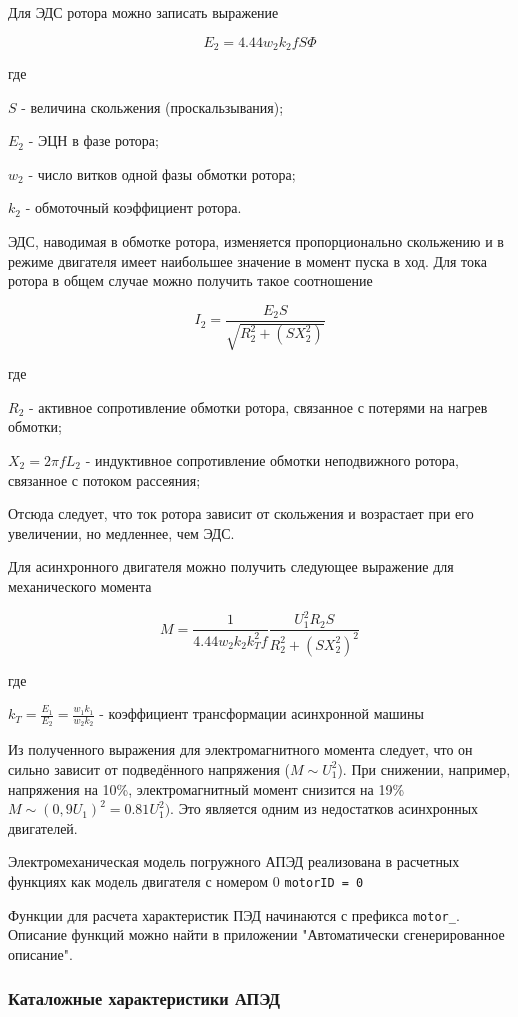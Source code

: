 Для ЭДС ротора можно записать выражение 


$$  E_2 = 4.44 w_2 k_2 f S \Phi $$

где 


$S$ - величина скольжения (проскальзывания);

$E_2$	- ЭЦН в фазе ротора;

$w_2$ - число витков одной фазы обмотки ротора;

$k_2$ - обмоточный коэффициент ротора.

ЭДС, наводимая в обмотке ротора, изменяется пропорционально скольжению и в режиме двигателя имеет наибольшее значение в момент пуска в ход.
Для тока ротора в общем случае можно получить такое соотношение

$$  I_2 = \frac{E_2 S}{\sqrt{R_2^2+(S X_2^2)}} $$

где 

$R_2$ -  активное сопротивление обмотки ротора, связанное с потерями на нагрев обмотки;  

$X_2 = 2 \pi f L_2$ - индуктивное сопротивление обмотки неподвижного ротора, связанное с потоком рассеяния;

Отсюда следует, что ток ротора зависит от скольжения и возрастает при его увеличении, но медленнее, чем ЭДС.

Для асинхронного двигателя можно получить следующее выражение для механического момента 

$$ M = \frac{1}{4.44 w_2 k_2 k_T^2 f} \frac{U_1^2 R_2 S}{R_2^2 + (S X_2^2)^2}$$

где 

$k_T = \frac{E_1}{E_2} = \frac{w_1 k_1}{w_2 k_2}$ - коэффициент трансформации асинхронной машины

Из полученного выражения для электромагнитного момента следует, что он сильно зависит от подведённого напряжения ($M \sim U_1^2$). При снижении, например, напряжения на 10\%, электромагнитный момент снизится на 19\% $M \sim (0,9U_1)^2=0.81 U_1^2)$. Это является одним из недостатков асинхронных двигателей. 

Электромеханическая модель погружного АПЭД реализована в расчетных функциях \unf{} как модель двигателя с номером 0  \texttt{motorID = 0}

Функции для расчета характеристик ПЭД начинаются с префикса \texttt{motor_}. Описание функций можно найти в приложении "Автоматически сгенерированное описание".

\subsubsection{Каталожные характеристики АПЭД}

